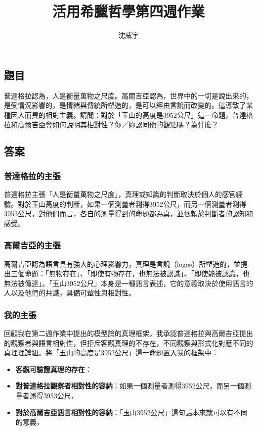 \documentclass[a4paper,12pt]{article}
\begin{document}
\title{活用希臘哲學第四週作業}
\author{沈威宇}
\date{\temtoday}
\temdoc
\subsection{題目}
普達格拉認為，人是衡量萬物之尺度。高爾吉亞認為，世界中的一切是說出來的，是受情況影響的，是情緒與傳統所塑造的，是可以經由言說而改變的。這導致了某種因人而異的相對主義。請問：對於「玉山的高度是3952公尺」這一命題，普達格拉和高爾吉亞會如何說明其相對性？你／妳認同他的觀點嗎？為什麼？
\subsection{答案}
\subsubsection{普達格拉的主張}
普達格拉主張「人是衡量萬物之尺度」，真理或知識的判斷取決於個人的感官經驗。對於玉山高度的判斷，如果一個測量者測得3952公尺，而另一個測量者測得3953公尺，對他們而言，各自的測量得到的命題都為真，並依賴於判斷者的認知和感受。
\subsubsection{高爾吉亞的主張}
高爾吉亞認為語言具有強大的心理影響力，真理是言說（logos）所塑造的，並提出三個命題：「無物存在」、「即使有物存在，也無法被認識」、「即使能被認識，也無法被傳達」。「玉山3952公尺」本身是一種語言表述，它的意義取決於使用語言的人以及他們的共識，具備可塑性與相對性。
\subsubsection{我的主張}
回顧我在第二週作業中提出的模型論的真理框架，我承認普達格拉與高爾吉亞提出的觀察者與語言相對性，但拒斥客觀真理的不存在，不同觀察與形式化對應不同的真理理論組。將「玉山的高度是3952公尺」這一命題置入我的框架中：
\begin{itemize}
\item\textbf{客觀可驗證真理的存在}：
\item\textbf{對普達格拉觀察者相對性的容納}：如果一個測量者測得3952公尺，而另一個測量者測得3953公尺，
\item\textbf{對於高爾吉亞語言相對性的容納}：「玉山3952公尺」這句話本來就可以有不同的意義，
\end{itemize}
\end{document}
